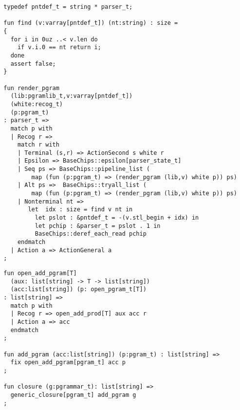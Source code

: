 \documentclass[oneside]{book}
\begin{document}
\begin{verbatim}
  typedef pntdef_t = string * parser_t;

  fun find (v:varray[pntdef_t]) (nt:string) : size = 
  {
    for i in 0uz ..< v.len do
      if v.i.0 == nt return i;
    done
    assert false;
  }

  fun render_pgram
    (lib:pgramlib_t,v:varray[pntdef_t])
    (white:recog_t)
    (p:pgram_t) 
  : parser_t =>
    match p with
    | Recog r => 
      match r with
      | Terminal (s,r) => ActionSecond s white r
      | Epsilon => BaseChips::epsilon[parser_state_t]
      | Seq ps => BaseChips::pipeline_list (
          map (fun (p:pgram_t) => (render_pgram (lib,v) white p)) ps) 
      | Alt ps =>  BaseChips::tryall_list (
          map (fun (p:pgram_t) => (render_pgram (lib,v) white p)) ps) 
      | Nonterminal nt => 
         let  idx : size = find v nt in
           let pslot : &pntdef_t = -(v.stl_begin + idx) in
           let pchip : &parser_t = pslot . 1 in
           BaseChips::deref_each_read pchip
      endmatch
    | Action a => ActionGeneral a
  ;
\end{verbatim}

\begin{verbatim}
  fun open_add_pgram[T] 
    (aux: list[string] -> T -> list[string])
    (acc:list[string]) (p: open_pgram_t[T]) 
  : list[string] =>
    match p with
    | Recog r => open_add_prod[T] aux acc r
    | Action a => acc
    endmatch
  ;

  fun add_pgram (acc:list[string]) (p:pgram_t) : list[string] =>
    fix open_add_pgram[pgram_t] acc p
  ;

  fun closure (g:pgrammar_t): list[string] =>
    generic_closure[pgram_t] add_pgram g
  ;
\end{verbatim}
\end{document}
